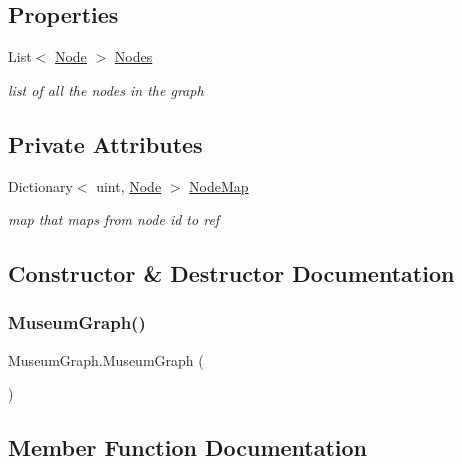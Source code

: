 \subsection*{Properties}
\begin{DoxyCompactItemize}
\item 
List$<$ \mbox{\hyperlink{class_museum_graph_1_1_node}{Node}} $>$ \mbox{\hyperlink{class_museum_graph_aa166ad4620069c3aaa4b87fd3ae4bfd7}{Nodes}}
\begin{DoxyCompactList}\small\item\em list of all the nodes in the graph \end{DoxyCompactList}\end{DoxyCompactItemize}
\subsection*{Private Attributes}
\begin{DoxyCompactItemize}
\item 
Dictionary$<$ uint, \mbox{\hyperlink{class_museum_graph_1_1_node}{Node}} $>$ \mbox{\hyperlink{class_museum_graph_a79484680da9ead2da6cca2a8225458e5}{Node\+Map}}
\begin{DoxyCompactList}\small\item\em map that maps from node id to ref \end{DoxyCompactList}\end{DoxyCompactItemize}


\subsection{Constructor \& Destructor Documentation}
\mbox{\label{class_museum_graph_a36c6cda2e0045c0d501e6c1c5dc286bf}} 
\subsubsection{\texorpdfstring{Museum\+Graph()}{MuseumGraph()}}
{\footnotesize\ttfamily Museum\+Graph.\+Museum\+Graph (\begin{DoxyParamCaption}{ }\end{DoxyParamCaption})}



\subsection{Member Function Documentation}
\mbox{\label{class_museum_graph_a36a26248bb9c304f8e67c60eb6d517f5}} 
